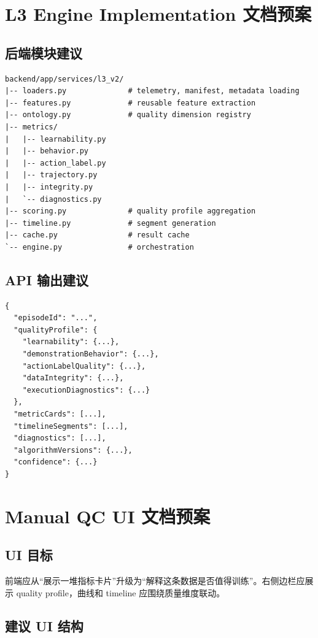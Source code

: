\documentclass[UTF8,zihao=-4]{ctexart}
\begin{document}
\section{L3 Engine Implementation 文档预案}

\subsection{后端模块建议}

\begin{verbatim}
backend/app/services/l3_v2/
|-- loaders.py              # telemetry, manifest, metadata loading
|-- features.py             # reusable feature extraction
|-- ontology.py             # quality dimension registry
|-- metrics/
|   |-- learnability.py
|   |-- behavior.py
|   |-- action_label.py
|   |-- trajectory.py
|   |-- integrity.py
|   `-- diagnostics.py
|-- scoring.py              # quality profile aggregation
|-- timeline.py             # segment generation
|-- cache.py                # result cache
`-- engine.py               # orchestration
\end{verbatim}

\subsection{API 输出建议}

\begin{verbatim}
{
  "episodeId": "...",
  "qualityProfile": {
    "learnability": {...},
    "demonstrationBehavior": {...},
    "actionLabelQuality": {...},
    "dataIntegrity": {...},
    "executionDiagnostics": {...}
  },
  "metricCards": [...],
  "timelineSegments": [...],
  "diagnostics": [...],
  "algorithmVersions": {...},
  "confidence": {...}
}
\end{verbatim}

\section{Manual QC UI 文档预案}

\subsection{UI 目标}

前端应从“展示一堆指标卡片”升级为“解释这条数据是否值得训练”。右侧边栏应展示 quality profile，曲线和 timeline 应围绕质量维度联动。

\subsection{建议 UI 结构}
\end{document}
